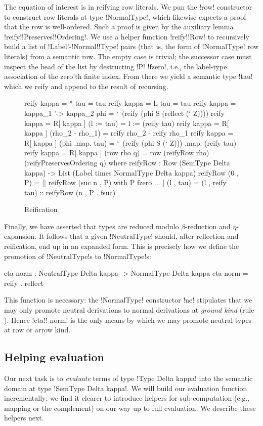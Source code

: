 \documentclass[sigplan,10pt,anonymous,review]{acmart}\settopmatter{printfolios=true,printccs=false,printacmref=false}
\begin{document}
The equation of interest is in reifying row literals. We pun the !row! constructor to construct row literals at type !NormalType!, which likewise expects a proof that the row is well-ordered. Such a proof is given by the auxiliary lemma !reify!\-!Preserves!\-!Ordering!. We use a helper function !reify!\-!Row! to recursively build a list of !Label!\--!Normal!\-!Type! pairs (that is, the form of !NormalType! row literals) from a semantic row. The empty case is trivial; the successor case must inspect the head of the list by destructing !P! !fzero!, i.e., the label\--type association of the zero'th finite index. From there we yield a semantic type !tau! which we reify and append to the result of recursing.
\begin{figure}
\begin{agda}
reify {kappa = *} tau = tau
reify {kappa = L} tau = tau
reify {kappa = kappa_1 '-> kappa_2} phi = 
  `\ (reify (phi S (reflect (` Z))))
reify {kappa = R[ kappa ]} (l := tau) = l := (reify tau)
reify {kappa = R[ kappa ]} (rho_2 - rho_1) = reify rho_2 - reify rho_1
reify {kappa = R[ kappa ]} (phi .map. tau) = 
  `\ (reify (phi S (` Z))) .map. (reify tau)
reify {kappa = R[ kappa ]} (row rho q) = 
  row (reifyRow rho) (reifyPreservesOrdering q)
  where
    reifyRow : Row (SemType Delta kappa) -> 
               List (Label times NormalType Delta kappa)
    reifyRow (0 , P) = [] 
    reifyRow (suc n , P) with P fzero 
    ... | (l , tau) = 
      (l , reify tau) :: reifyRow (n , P . fsuc)
\end{agda}
\caption{Reification}
\label{fig:reification}
\end{figure}

Finally, we have asserted that types are reduced modulo $\beta$-reduction and $\eta$-expansion. It follows that a given !NeutralType! should, after reflection and reification, end up in an expanded form. This is precisely how we define the promotion of !NeutralType!s to !NormalType!s: 

\begin{agda}
eta-norm : NeutralType Delta kappa -> NormalType Delta kappa
eta-norm = reify . reflect
\end{agda}

This function is necessary: the !NormalType! constructor !ne! stipulates that we may only promote neutral derivations to normal derivations at \emph{ground kind} (rule ). Hence !eta!!-norm! is the only means by which we may promote neutral types at row or arrow kind.

\subsection{Helping evaluation}
\label{sec:helping-evaluation}
Our next task is to \emph{evaluate} terms of type !Type Delta kappa! into the semantic domain at type !SemType Delta kappa!. We will build our evaluation function incrementally; we find it clearer to introduce helpers for sub-computation (e.g., mapping or the complement) on our way up to full evaluation. We describe these helpers next.
\end{document}
